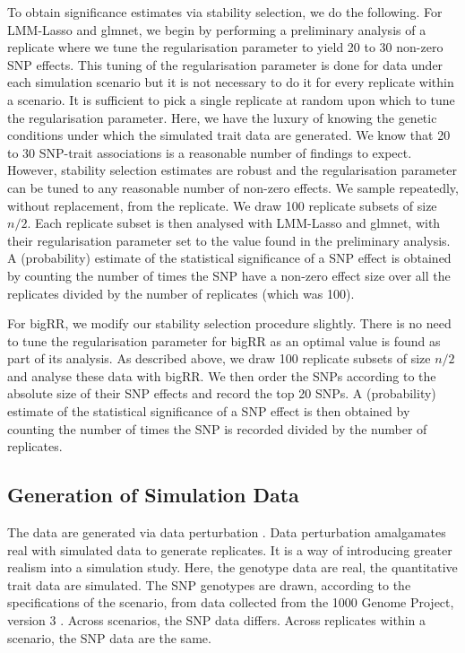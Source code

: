 \documentclass{article}
\begin{document}
To obtain significance estimates via stability selection, we do the following. For LMM-Lasso and glmnet, we begin
 by performing a preliminary analysis of a replicate where  we tune the  regularisation parameter to yield 20 to 30 non-zero SNP effects.
This tuning of the regularisation parameter is done for data under each simulation scenario but it is not necessary to do it for every replicate within a scenario. It is sufficient to pick a single replicate at random upon which to tune the regularisation parameter. 
Here, we have the luxury of knowing the genetic conditions 
under which the simulated trait data are generated. We know that 20 to 30 SNP-trait associations is a reasonable number of findings to expect. 
 However, stability selection estimates are robust  \citep{meinshausen2010stability} 
 and the regularisation parameter can be tuned to any reasonable number of 
 non-zero effects. We sample repeatedly, without replacement, from the replicate. We draw 100 replicate subsets of size $n/2$.  
Each replicate subset is then analysed with LMM-Lasso and glmnet, with their regularisation parameter set to the value found in the preliminary analysis. 
A (probability) estimate of the statistical significance of a SNP effect is obtained by counting the 
number of times the SNP have a non-zero effect size over all the replicates divided by the number of replicates (which was 100). 

For bigRR, we modify our stability selection procedure slightly. 
There is no need to tune the regularisation parameter for bigRR as an optimal value is found as part of its analysis. 
As described above, we draw 100 replicate subsets of size $n/2$ and analyse these data with bigRR. We then order the 
SNPs according to the absolute size of their SNP effects and record the top 20 SNPs. 
A (probability)  estimate of the statistical significance of a SNP effect is then obtained by counting the 
number of times the SNP is recorded divided by the number of replicates. 




\subsection{Generation of Simulation Data}

The data are generated via data perturbation \citep{zhao2007arabidopsis}. 
Data perturbation amalgamates real with simulated data to generate replicates. 
It is a way of introducing greater realism into a simulation study. 
 Here, the genotype data are real, the 
quantitative trait data are simulated. 
 The SNP genotypes are drawn, 
according to the specifications of the scenario, from data collected from the 1000 Genome Project, version 3   \citep{10002010map}. 
Across scenarios, the SNP data differs. Across replicates within a scenario, the SNP data are the same. 
\end{document}

